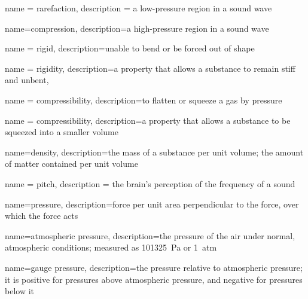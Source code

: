 


{
    name = rarefaction,
    description = {a low-pressure region in a sound wave}
}


{
    name=compression,
    description={a high-pressure region in a sound wave}
}

{
    name = rigid,
    description={unable to bend or be forced out of shape}
}

{
    name = rigidity,
    description={a property that allows a substance to remain stiff and unbent},
}

{
    name = compressibility,
    description={to flatten or squeeze a gas by pressure}
}

{
    name = compressibility,
    description={a property that allows a substance to be squeezed into a smaller volume}
}

{
    name=density,
    description={the mass of a substance per unit volume; the amount of matter contained per unit volume}
}


{
    name = pitch,
    description = {the brain's perception of the frequency of a sound}
}

{
    name=pressure,
    description={force per unit area perpendicular to the force, over which the force acts}
}

{
    name={atmospheric pressure},
    description={the pressure of the air under normal, atmospheric conditions; measured as \SI{101325}{Pa} or \SI{1}{atm}}
}

{
    name={gauge pressure},
    description={the pressure relative to atmospheric pressure; it is positive for pressures above atmospheric pressure, and negative for pressures below it}
}

